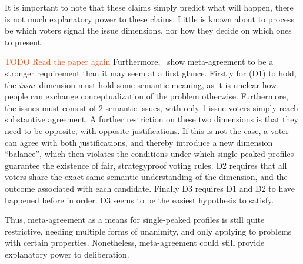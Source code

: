 It is important to note that these claims simply predict what will happen,
there is not much explanatory power to these claims. Little is known about to
process be which voters signal the issue dimensions, nor how they decide on
which ones to present.

\textcolor{OrangeRed}{TODO Read the paper again}
Furthermore,~\citet{ottonelliElusiveNotionMetaagreement2013} show
meta-agreement to be a stronger requirement than it may seem at a first glance.
Firstly for (D1) to hold, the \emph{issue}-dimension must hold some semantic
meaning, as it is unclear how people can exchange conceptualization
of the problem otherwise. Furthermore, the issues must consist of 2 semantic
issues, with only 1 issue voters simply reach substantive
agreement. A further restriction on these two dimensions is that they need to
be opposite, with opposite justifications. If this is not the case, a voter can
agree with both justifications, and thereby introduce a new dimension
``balance'', which then violates the conditions under which single-peaked
profiles guarantee the existence of fair, strategyproof voting rules. D2
requires that all voters share the exact same semantic understanding of the
dimension, and the outcome associated with each candidate. Finally D3
requires D1 and D2 to have happened before in order. D3 seems to be the easiest
hypothesis to satisfy.

Thus, meta-agreement as a means for single-peaked profiles is still quite
restrictive, needing multiple forms of unanimity, and only applying to problems
with certain properties. Nonetheless,  meta-agreement could still provide
explanatory power to deliberation.

